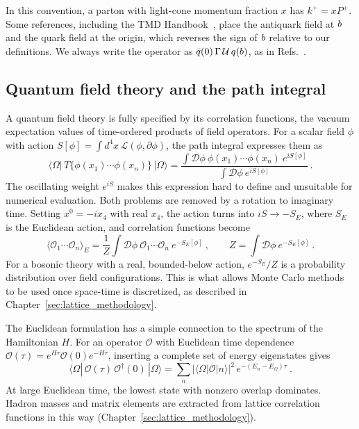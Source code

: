 In this convention, a parton with light-cone momentum fraction $x$ has $k^+ = xP^+$. Some references, including the TMD Handbook~\cite{Boussarie:2023izj}, place the antiquark field at $b$ and the quark field at the origin, which reverses the sign of $b$ relative to our definitions. We always write the operator as $\bar{q}(0)\,\Gamma\,\mathcal{U}\,q(b)$, as in Refs.~\cite{Musch:2010ka,Musch:2011er}.

\subsection{Quantum field theory and the path integral}
\label{sec:path_integral}

A quantum field theory is fully specified by its correlation functions, the vacuum expectation values of time-ordered products of field operators. For a scalar field $\phi$ with action $S[\phi] = \int d^4x\, \mathcal{L}(\phi,\partial\phi)$, the path integral expresses them as~\cite{Peskin:1995ev}
\begin{equation}
  \langle\Omega|\,T\{\phi(x_1)\cdots\phi(x_n)\}\,|\Omega\rangle
  = \frac{\int\mathcal{D}\phi\ \phi(x_1)\cdots\phi(x_n)\ e^{iS[\phi]}}{\int\mathcal{D}\phi\ e^{iS[\phi]}} \ .
  \label{eq:minkowski_pi}
\end{equation}
The oscillating weight $e^{iS}$ makes this expression hard to define and unsuitable for numerical evaluation. Both problems are removed by a rotation to imaginary time. Setting $x^0 = -i x_4$ with real $x_4$, the action turns into $iS \to -S_E$, where $S_E$ is the Euclidean action, and correlation functions become
\begin{equation}
  \langle \mathcal{O}_1\cdots\mathcal{O}_n\rangle_E = \frac{1}{Z}\int\mathcal{D}\phi\ \mathcal{O}_1\cdots\mathcal{O}_n\ e^{-S_E[\phi]}\ ,
  \qquad Z = \int\mathcal{D}\phi\ e^{-S_E[\phi]} \ .
  \label{eq:euclidean_pi}
\end{equation}
For a bosonic theory with a real, bounded-below action, $e^{-S_E}/Z$ is a probability distribution over field configurations. This is what allows Monte Carlo methods to be used once space-time is discretized, as described in Chapter~\ref{sec:lattice_methodology}.

The Euclidean formulation has a simple connection to the spectrum of the Hamiltonian $H$. For an operator $\mathcal{O}$ with Euclidean time dependence $\mathcal{O}(\tau) = e^{H\tau}\mathcal{O}(0)e^{-H\tau}$, inserting a complete set of energy eigenstates gives
\begin{equation}
  \langle\Omega|\,\mathcal{O}(\tau)\,\mathcal{O}^\dagger(0)\,|\Omega\rangle = \sum_n \big|\langle\Omega|\mathcal{O}|n\rangle\big|^2\, e^{-(E_n - E_\Omega)\tau} \ .
  \label{eq:spectral_decomposition}
\end{equation}
At large Euclidean time, the lowest state with nonzero overlap dominates. Hadron masses and matrix elements are extracted from lattice correlation functions in this way (Chapter~\ref{sec:lattice_methodology}).

